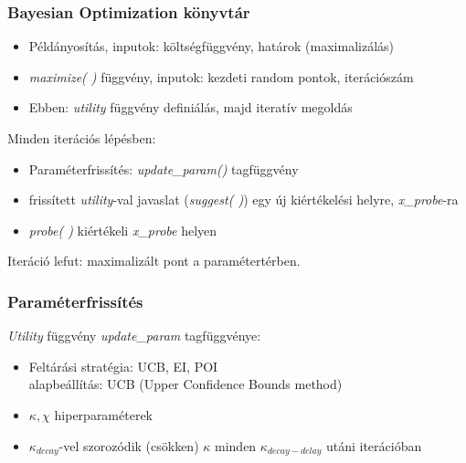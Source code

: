 \documentclass[aspectratio=43]{beamer}
\begin{document}
\begin{frame}
	\frametitle{Bayesian Optimization könyvtár}
	\begin{itemize}
		\item Példányosítás, inputok: költségfüggvény, határok 
		(maximalizálás)
		\item \textit{maximize( )} függvény, inputok: kezdeti random pontok, iterációszám
		\item Ebben: \textit{utility} függvény definiálás, majd iteratív megoldás
	\end{itemize}
	\pause
	Minden iterációs lépésben:
	\begin{itemize}
		\item Paraméterfrissítés: \textit{update\_param()} tagfüggvény
		\item frissített \textit{utility}-val javaslat (\textit{suggest( )}) egy új kiértékelési helyre, \textit{x\_probe}-ra
		\item \textit{probe( )} kiértékeli \textit{x\_probe} helyen
	\end{itemize}
	Iteráció lefut: maximalizált pont a paramétertérben.
\end{frame}

\begin{frame}
	\frametitle{Paraméterfrissítés}
	\textit{Utility} függvény \textit{update\_param} tagfüggvénye:
	\begin{itemize}
		\item Feltárási stratégia: UCB, EI, POI\\alapbeállítás: UCB (Upper Confidence Bounds method)
		\item $\kappa, \chi$ hiperparaméterek
		\item $\kappa_{decay}$-vel szorozódik (csökken) $\kappa$ minden $\kappa_{decay-delay}$ utáni iterációban
	\end{itemize}
\end{frame}
\end{document}
